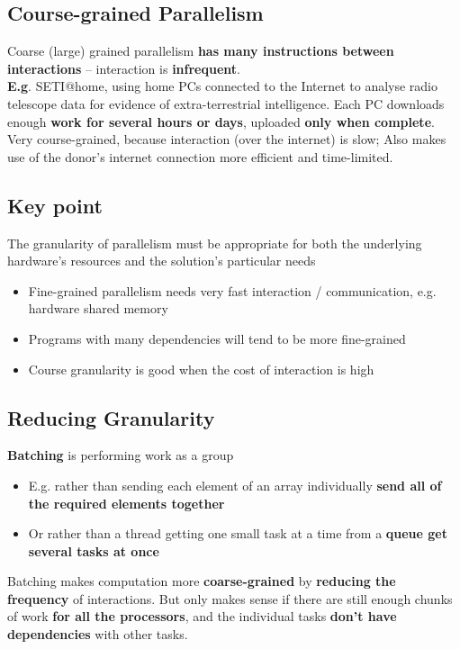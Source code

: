 \documentclass{article}
\begin{document}
\subsection{Course-grained	Parallelism}
\begin{flushleft}
Coarse (large) grained parallelism \textbf{has many instructions between interactions} – interaction is \textbf{infrequent}.\\
\textbf{ E.g}. SETI@home, using home PCs connected to the Internet to analyse radio telescope data for evidence of extra-terrestrial intelligence. Each PC downloads enough \textbf{work for several hours or days}, uploaded \textbf{only when complete}. Very course-grained, because interaction (over the internet) is slow; Also makes use of the donor’s internet connection more efficient and time-limited.
\end{flushleft}

\subsection{Key point}
\begin{flushleft}
The granularity of parallelism must be appropriate for both the underlying hardware’s resources and the solution’s particular needs
 \begin{itemize}
   \item Fine-grained parallelism needs very fast interaction / communication, e.g. hardware shared memory
   \item Programs with many dependencies will tend to be more fine-grained
   \item Course granularity is good when the cost of interaction is high
 \end{itemize} 
\end{flushleft}

\subsection{Reducing Granularity}
\begin{flushleft}
\textbf{Batching} is performing work as a group
\begin{itemize}
  \item E.g. rather than sending each element of an array individually \textbf{send all of the required elements together}
  \item Or rather than a thread getting one small task at a time from a \textbf{queue get several tasks at once}
\end{itemize}
Batching makes computation more \textbf{coarse-grained} by \textbf{reducing the frequency} of interactions. But only makes sense if there are still enough chunks of work \textbf{for all the processors}, and the individual tasks \textbf{don’t have dependencies} with other tasks.
\end{flushleft}
\end{document}
